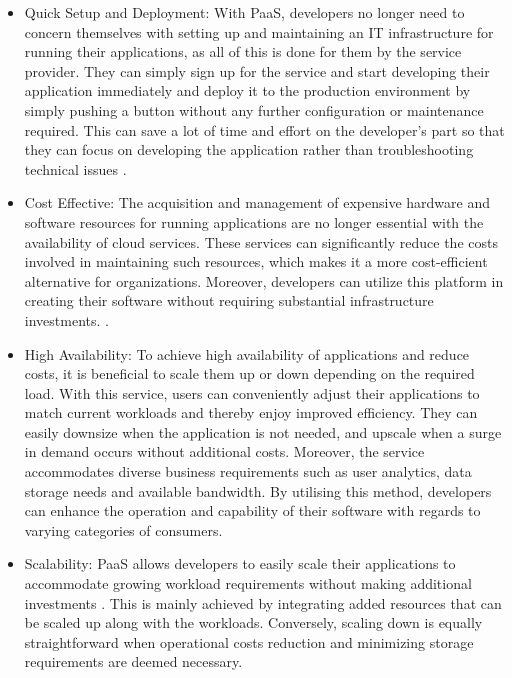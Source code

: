 \documentclass[BIF,Bachelor,nenglish]{twbook}%
\begin{document}
\begin{itemize}
\item Quick Setup and Deployment: With PaaS, developers no longer need to concern themselves with setting up and maintaining an IT infrastructure for running their applications, as all of this is done for them by the service provider. They can simply sign up for the service and start developing their application immediately and deploy it to the production environment by simply pushing a button without any further configuration or maintenance required. This can save a lot of time and effort on the developer's part so that they can focus on developing the application rather than troubleshooting technical issues \cite{law2008}.

\item Cost Effective: The acquisition and management of expensive hardware and software resources for running applications are no longer essential with the availability of cloud services. These services can significantly reduce the costs involved in maintaining such resources, which makes it a more cost-efficient alternative for organizations. Moreover, developers can utilize this platform in creating their software without requiring substantial infrastructure investments. \cite{gai2014}.

\item High Availability: To achieve high availability of applications and reduce costs, it is beneficial to scale them up or down depending on the required load. With this service, users can conveniently adjust their applications to match current workloads and thereby enjoy improved efficiency. They can easily downsize when the application is not needed, and upscale when a surge in demand occurs without additional costs. Moreover, the service accommodates diverse business requirements such as user analytics, data storage needs and available bandwidth. By utilising this method, developers can enhance the operation and capability of their software with regards to varying categories of consumers\cite{IaasHigh}.

\item Scalability: PaaS allows developers to easily scale their applications to accommodate growing workload requirements without making additional investments \cite{law2008}. This is mainly achieved by integrating added resources that can be scaled up along with the workloads. Conversely, scaling down is equally straightforward when operational costs reduction and minimizing storage requirements are deemed necessary.
\end{itemize}
\end{document}
